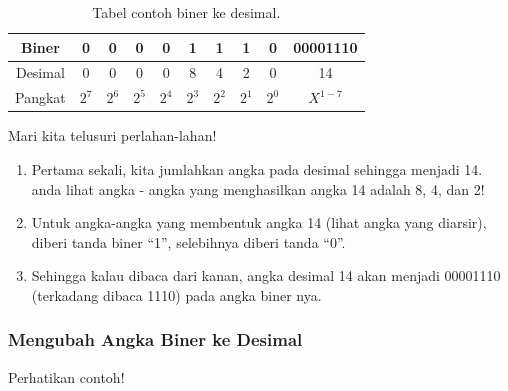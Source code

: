 \documentclass{article}
\begin{document}
\begin{table}[h!]
\centering
\begin{tabular}{ |c|c|c|c|c|c|c|c|c|c| } 
\hline
Biner & 0 & 0 & 0 & 0 & 1 & 1 & 1 & 0 & 00001110 \\ 
\hline
Desimal & 0 & 0 & 0 & 0 & 8 & 4 & 2 & 0 & 14 \\ 
\hline
Pangkat & $2^7$ & $2^6$ & $2^5$ & $2^4$ & $2^3$ & $2^2$ & $2^1$ & $2^0$ & $X^{1-7}$ \\ 
\hline
\end{tabular}
\caption{Tabel contoh biner ke desimal.}
\label{table:contoh1}
\end{table}

Mari kita telusuri perlahan-lahan!

\begin{enumerate}
\item Pertama sekali, kita jumlahkan angka pada desimal sehingga menjadi 14. anda lihat angka - angka yang menghasilkan angka 14 adalah 8, 4, dan 2!
\item Untuk angka-angka yang membentuk angka 14 (lihat angka yang diarsir), diberi tanda biner “1”, selebihnya diberi tanda “0”.
\item Sehingga kalau dibaca dari kanan, angka desimal 14 akan menjadi 00001110 (terkadang dibaca 1110) pada angka biner nya.
\end{enumerate}


\subsubsection{Mengubah Angka Biner ke Desimal}
Perhatikan contoh! 
\end{document}
